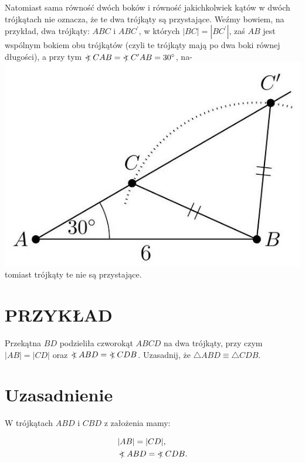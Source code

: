 \documentclass[10pt]{article}
\newcommand\Varangle{\mathop{{<\!\!\!\!\!\text{\small)}}\:}\nolimits}
\begin{document}
Natomiast sama równość dwóch boków i równość jakichkolwiek kątów w dwóch trójkątach nie oznacza, że te dwa trójkąty są przystające. Weźmy bowiem, na przykład, dwa trójkąty: \(A B C\) i \(A B C^{\prime}\), w których \(|B C|=\left|B C^{\prime}\right|\), zaś \(A B\) jest wspólnym bokiem obu trójkątów (czyli te trójkąty mają po dwa boki równej długości), a przy tym \(\Varangle C A B=\Varangle C^{\prime} A B=30^{\circ}\), na-\\
\includegraphics[max width=\textwidth, center]{2024_11_21_71f62bd117d375398909g-046(1)}\\
tomiast trójkąty te nie są przystające.

\section*{PRZYKŁAD}
Przekątna \(B D\) podzieliła czworokąt \(A B C D\) na dwa trójkąty, przy czym \(|A B|=|C D|\) oraz \(\Varangle A B D=\Varangle C D B\). Uzasadnij, że \(\triangle A B D \equiv \triangle C D B\).

\section*{Uzasadnienie}
W trójkątach \(A B D\) i \(C B D\) z założenia mamy:

\[
\begin{aligned}
& |A B|=|C D|, \\
& \Varangle A B D=\Varangle C D B .
\end{aligned}
\]
\end{document}
